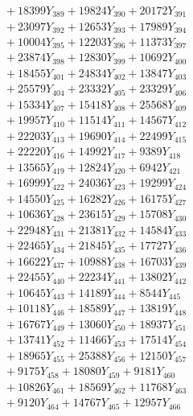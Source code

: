 \documentclass[a4paper,10pt]{article}
\begin{document}
{\begin{align}
&\;  + 18399 Y_{389} + 19824 Y_{390} + 20172 Y_{391} \\[0.3ex]
&\;  + 23097 Y_{392} + 12653 Y_{393} + 17989 Y_{394} \\[0.3ex]
&\;  + 10004 Y_{395} + 12203 Y_{396} + 11373 Y_{397} \\[0.3ex]
&\;  + 23874 Y_{398} + 12830 Y_{399} + 10692 Y_{400} \\[0.3ex]
&\;  + 18455 Y_{401} + 24834 Y_{402} + 13847 Y_{403} \\[0.3ex]
&\;  + 25579 Y_{404} + 23332 Y_{405} + 23329 Y_{406} \\[0.3ex]
&\;  + 15334 Y_{407} + 15418 Y_{408} + 25568 Y_{409} \\[0.3ex]
&\;  + 19957 Y_{410} + 11514 Y_{411} + 14567 Y_{412} \\[0.3ex]
&\;  + 22203 Y_{413} + 19690 Y_{414} + 22499 Y_{415} \\[0.3ex]
&\;  + 22220 Y_{416} + 14992 Y_{417} + 9389 Y_{418} \\[0.5ex]\allowbreak
&\;  + 13565 Y_{419} + 12824 Y_{420} + 6942 Y_{421} \\[0.3ex]
&\;  + 16999 Y_{422} + 24036 Y_{423} + 19299 Y_{424} \\[0.3ex]
&\;  + 14550 Y_{425} + 16282 Y_{426} + 16175 Y_{427} \\[0.3ex]
&\;  + 10636 Y_{428} + 23615 Y_{429} + 15708 Y_{430} \\[0.3ex]
&\;  + 22948 Y_{431} + 21381 Y_{432} + 14584 Y_{433} \\[0.3ex]
&\;  + 22465 Y_{434} + 21845 Y_{435} + 17727 Y_{436} \\[0.3ex]
&\;  + 16622 Y_{437} + 10988 Y_{438} + 16703 Y_{439} \\[0.3ex]
&\;  + 22455 Y_{440} + 22234 Y_{441} + 13802 Y_{442} \\[0.3ex]
&\;  + 10645 Y_{443} + 14189 Y_{444} + 8544 Y_{445} \\[0.3ex]
&\;  + 10118 Y_{446} + 18589 Y_{447} + 13819 Y_{448} \\[0.5ex]\allowbreak
&\;  + 16767 Y_{449} + 13060 Y_{450} + 18937 Y_{451} \\[0.3ex]
&\;  + 13741 Y_{452} + 11466 Y_{453} + 17514 Y_{454} \\[0.3ex]
&\;  + 18965 Y_{455} + 25388 Y_{456} + 12150 Y_{457} \\[0.3ex]
&\;  + 9175 Y_{458} + 18080 Y_{459} + 9181 Y_{460} \\[0.3ex]
&\;  + 10826 Y_{461} + 18569 Y_{462} + 11768 Y_{463} \\[0.3ex]
&\;  + 9120 Y_{464} + 14767 Y_{465} + 12957 Y_{466} \\[0.3ex]

\end{align}}
\end{document}
